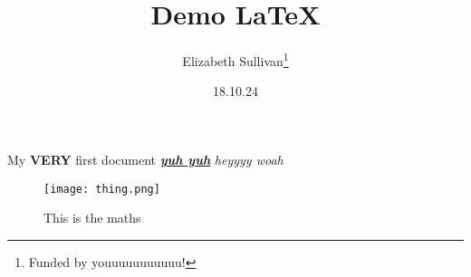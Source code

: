 \documentclass[a4paper]{article}
\title{Demo LaTeX }
\author{Elizabeth Sullivan\thanks {Funded by youuuuuuuuuuu!}}
\date{18.10.24}
\begin{document}
\maketitle
My \textbf{VERY} first document \underline{\textbf{\textit{yuh yuh}}}
\textit{heyyyy \emph{woah}}


\begin{figure}
    \centering
    \texttt{[image: thing.png]}
    \caption{This is the maths}
    \label{fig:enter-label}
\end{figure}
\end{document}
